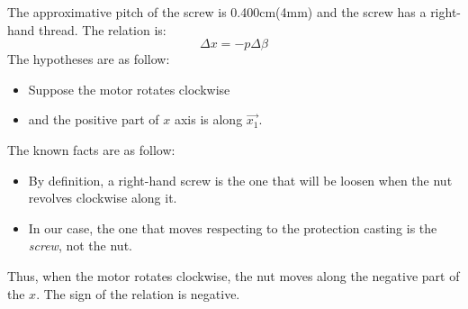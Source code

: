 \documentclass{mechexpans}
\author{}
\def\BetaLabel{The rotation of the motor $\beta$(round)}
\def\ThetaLabel{The rotation of the arm $\theta$ \si{\degree}}
\begin{document}
\maketitle
\begin{solution}
\end{solution}

\begin{solution}
\end{solution}

\begin{solution}
  The approximative pitch of the screw is 0.400\si{\cm}(4\si{\mm}) and the screw has a right-hand thread.
  The relation is:
  \begin{equation*}
    \Delta x = - p\Delta\beta
  \end{equation*}
  The hypotheses are as follow:
  \begin{itemize}
    \item Suppose the motor rotates clockwise
    \item and the positive part of $x$ axis is along $\vec{x_1}$.
  \end{itemize}
  The known facts are as follow:
  \begin{itemize}
    \item By definition, a right-hand screw is the one that will be loosen when the nut revolves clockwise along it.
    \item In our case, the one that moves respecting to the protection casting is the \emph{screw}, not the nut.
  \end{itemize}
  Thus, when the motor rotates clockwise, the nut moves along the negative part of the $x$.
  The sign of the relation is negative.
\end{solution}
\end{document}
